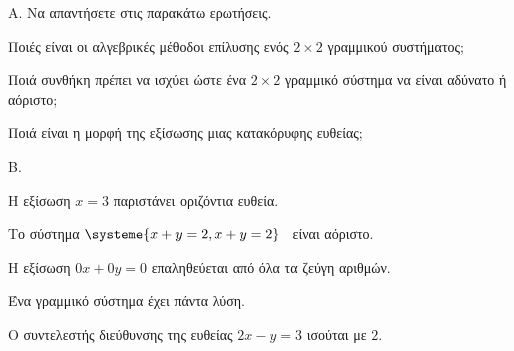 Α. Να απαντήσετε στις παρακάτω ερωτήσεις.
\begin{rlist}
\item Ποιές είναι οι αλγεβρικές μέθοδοι επίλυσης ενός $ 2\times2 $ γραμμικού συστήματος;
\item Ποιά συνθήκη πρέπει να ισχύει ώστε ένα $ 2\times2 $ γραμμικό σύστημα να είναι αδύνατο ή αόριστο;
\item Ποιά είναι η μορφή της εξίσωσης μιας κατακόρυφης ευθείας;
\end{rlist}
Β. \swstolathos
\begin{rlist}
\item Η εξίσωση $ x=3 $ παριστάνει οριζόντια ευθεία.
\item Το σύστημα $ \systeme{x+y=2,x+y=2} $ \ είναι αόριστο.
\item Η εξίσωση $ 0x+0y=0 $ επαληθεύεται από όλα τα ζεύγη αριθμών.
\item Ένα γραμμικό σύστημα έχει πάντα λύση.
\item Ο συντελεστής διεύθυνσης της ευθείας $ 2x-y=3 $ ισούται με $ 2 $.
\end{rlist}